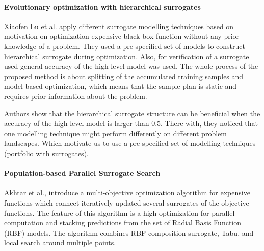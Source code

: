         \paragraph{Evolutionary optimization with hierarchical surrogates} Xiaofen Lu et al. \cite{LuST19} apply different surrogate modelling techniques based on motivation on optimization expensive black-box function without any prior knowledge of a problem. They used a pre-specified set of models to construct hierarchical surrogate during optimization. Also, for verification of a surrogate used general accuracy of the high-level model was used. The whole process of the proposed method is about splitting of the accumulated training samples and model-based optimization, which means that the sample plan is static and requires prior information about the problem. 

        Authors show that the hierarchical surrogate structure can be beneficial when the accuracy of the high-level model is larger than 0.5. There with, they noticed that one modelling technique might perform differently on different problem landscapes. Which motivate us to use a pre-specified set of modelling techniques (portfolio with surrogates).
        
        \paragraph{Population-based Parallel Surrogate Search} Akhtar et al.,\cite{akhtar2019efficient} introduce a multi-objective optimization algorithm for expensive functions which connect iteratively updated several surrogates of the objective functions. The feature of this algorithm is a high optimization for parallel computation and stacking predictions from the set of Radial Basis Function (RBF) models. The algorithm combines RBF composition surrogate, Tabu, and local search around multiple points. 


